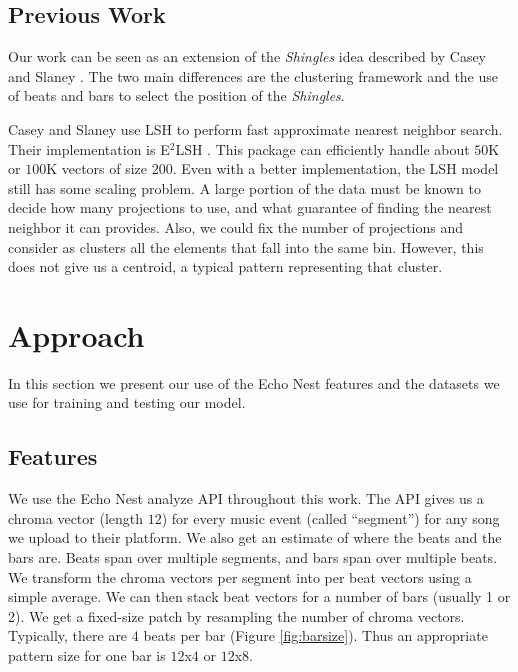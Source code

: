 \documentclass{article}
\begin{document}
\subsection{Previous Work}\label{sec:prevwork}
Our work can be seen as an extension of the \textit{Shingles} idea
described by Casey and Slaney \cite{Casey2006,Casey2007,Casey2008}.
The two main differences are the clustering framework and the use of
beats and bars to select the position of the \textit{Shingles}.

Casey and Slaney \cite{Casey2006} use LSH \cite{Datar2004} to perform
fast approximate nearest neighbor search. Their implementation is E$^2$LSH
\cite{E2LSH}. This package can efficiently handle about $50$K or $100$K
vectors of size $200$. Even with a better implementation, the LSH
model still has some scaling problem. A large portion of the data
must be known to decide how many projections to use, and what guarantee
of finding the nearest neighbor it can provides. Also, we could fix the
number of projections and consider as clusters all the elements that
fall into the same bin. However, this does not give us a centroid, a
typical pattern representing that cluster.


\section{Approach}\label{sec:approach}
In this section we present our use of the Echo Nest features and the
datasets we use for training and testing our model.

\subsection{Features}
We use the Echo Nest analyze API \cite{EchoNest} throughout this work.
The API gives us a chroma vector (length $12$) for every music event (called 
``segment'') for any song we upload to their platform. 
We also get an estimate of where the beats and the bars are. Beats span over
multiple segments, and bars span over multiple beats. 
We transform the chroma vectors per segment into per beat vectors using a 
simple average. We can then stack beat vectors for a number of bars 
(usually 1 or 2). 
We get a fixed-size patch by resampling the number of chroma vectors. Typically,
there are $4$ beats per bar (Figure \ref{fig:barsize}). 
Thus an appropriate pattern size for one bar
is $12$x$4$ or $12$x$8$.
\end{document}
